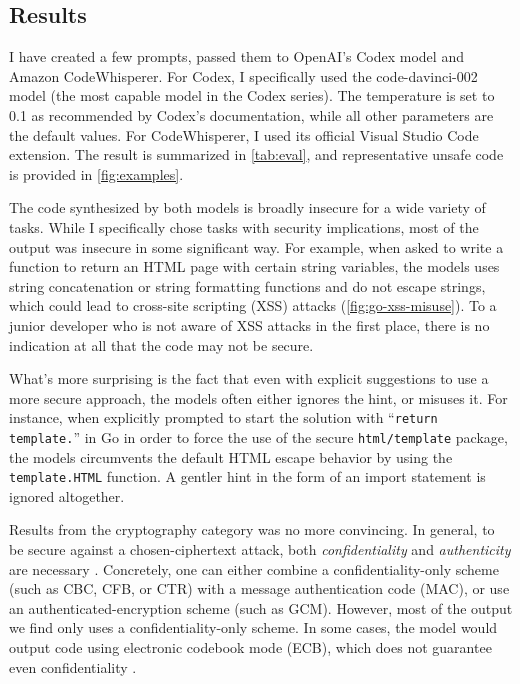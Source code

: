 \documentclass[sigplan,screen,nonacm]{acmart}
\begin{document}
\subsection{Results}
I have created a few prompts, passed them to Open\-AI's Codex model and Amazon Code\-Whis\-per\-er. For Codex, I specifically used the \textsf{code-\allowbreak{}da\-vinci-\allowbreak{}002} model (the most capable model in the Codex series). The temperature is set to 0.1 as recommended by Codex's documentation, while all other parameters are the default values. For Code\-Whis\-per\-er, I used its official Visual Studio Code extension. The result is summarized in \cref{tab:eval}, and representative unsafe code is provided in \cref{fig:examples}.

The code synthesized by both models is broadly insecure for a wide variety of tasks. While I specifically chose tasks with security implications, most of the output was insecure in some significant way. For example, when asked to write a function to return an HTML page with certain string variables, the models uses string concatenation or string formatting functions and do not escape strings, which could lead to cross-site scripting (XSS) attacks (\cref{fig:go-xss-misuse}). To a junior developer who is not aware of XSS attacks in the first place, there is no indication at all that the code may not be secure.

What's more surprising is the fact that even with explicit suggestions to use a more secure approach, the models often either ignores the hint, or misuses it. For instance, when explicitly prompted to start the solution with ``\texttt{return\allowbreak{} tem\-plate.}'' in Go in order to force the use of the secure \texttt{html/tem\-plate} package, the models circumvents the default HTML escape behavior by using the \texttt{tem\-plate.HTML} function. A gentler hint in the form of an import statement is ignored altogether.

Results from the cryptography category was no more convincing. In general, to be secure against a chosen-ciphertext attack, both \emph{confidentiality} and \emph{authenticity} are necessary \cite{cryptobook}. Concretely, one can either combine a confidentiality-only scheme (such as CBC, CFB, or CTR) with a message authentication code (MAC), or use an authenticated-encryption scheme (such as GCM). However, most of the output we find only uses a confidentiality-only scheme. In some cases, the model would output code using electronic codebook mode (ECB), which does not guarantee even confidentiality \cite{cryptobook}.
\end{document}
